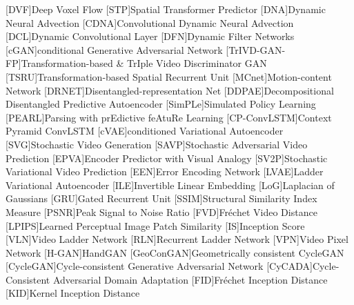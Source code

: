 \begin{acronym}
    [DVF]{Deep Voxel Flow}
    [STP]{Spatial Transformer Predictor}
    [DNA]{Dynamic Neural Advection}
    [CDNA]{Convolutional Dynamic Neural Advection}
    [DCL]{Dynamic Convolutional Layer}
    [DFN]{Dynamic Filter Networks}
    [cGAN]{conditional Generative Adversarial Network}
    [TrIVD-GAN-FP]{Transformation-based \& TrIple Video Discriminator GAN}
    [TSRU]{Transformation-based Spatial Recurrent Unit}
    [MCnet]{Motion-content Network}
    [DRNET]{Disentangled-representation Net}
    [DDPAE]{Decompositional Disentangled Predictive Autoencoder}
    [SimPLe]{Simulated Policy Learning}
    [PEARL]{Parsing with prEdictive feAtuRe Learning}
    [CP-ConvLSTM]{Context Pyramid ConvLSTM}
    [cVAE]{conditioned Variational Autoencoder}
    [SVG]{Stochastic Video Generation}
    [SAVP]{Stochastic Adversarial Video Prediction}
    [EPVA]{Encoder Predictor with Visual Analogy}
    [SV2P]{Stochastic Variational Video Prediction}
    [EEN]{Error Encoding Network}
    [LVAE]{Ladder Variational Autoencoder}
    [ILE]{Invertible Linear Embedding}
    [LoG]{Laplacian of Gaussians}
    [GRU]{Gated Recurrent Unit}
    [SSIM]{Structural Similarity Index Measure}
    [PSNR]{Peak Signal to Noise Ratio}
    [FVD]{Fréchet Video Distance}
    [LPIPS]{Learned Perceptual Image Patch Similarity}
    [IS]{Inception Score}
    [VLN]{Video Ladder Network}
    [RLN]{Recurrent Ladder Network}
    [VPN]{Video Pixel Network}
    [H-GAN]{HandGAN}
    [GeoConGAN]{Geometrically consistent CycleGAN}
    [CycleGAN]{Cycle-consistent Generative Adversarial Network}
    [CyCADA]{Cycle-Consistent Adversarial Domain Adaptation}
    [FID]{Fréchet Inception Distance}
    [KID]{Kernel Inception Distance}
\end{acronym}

